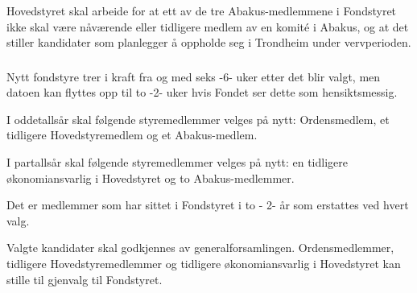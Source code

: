 \subsubsection{}
Hovedstyret skal arbeide for at ett av de tre Abakus-medlemmene i Fondstyret ikke skal være nåværende eller tidligere medlem av en komité i Abakus,
og at det stiller kandidater som planlegger å oppholde seg i Trondheim under vervperioden.

\subsubsection{}
Nytt fondstyre trer i kraft fra og med seks -6- uker etter det blir valgt, men datoen kan flyttes opp til to -2- uker hvis Fondet ser dette som hensiktsmessig.

I oddetallsår skal følgende styremedlemmer velges på nytt: Ordensmedlem, et tidligere
Hovedstyremedlem og et Abakus-medlem.

I partallsår skal følgende styremedlemmer velges på nytt: en tidligere
økonomiansvarlig i Hovedstyret og to Abakus-medlemmer.

Det er medlemmer som har sittet i Fondstyret i to - 2- år som erstattes ved hvert valg.

Valgte kandidater skal godkjennes av generalforsamlingen. Ordensmedlemmer,
tidligere Hovedstyremedlemmer og tidligere økonomiansvarlig i Hovedstyret kan
stille til gjenvalg til Fondstyret.
